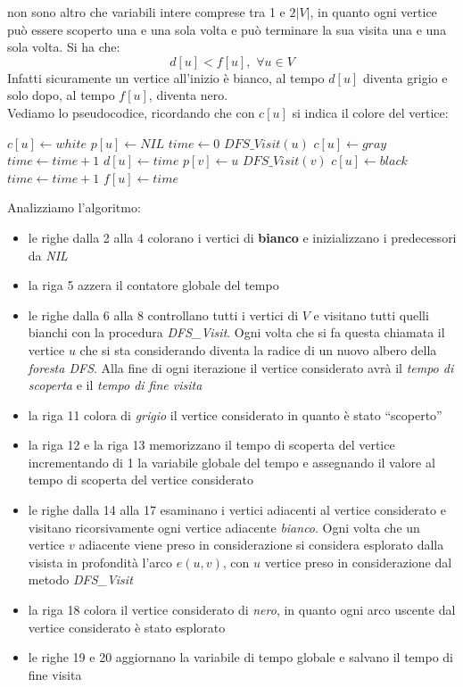 \documentclass[a4paper,12pt, oneside]{book}
\begin{document}
non sono altro che variabili intere comprese tra 1 e $2|V|$, in quanto
ogni vertice può essere scoperto una e una sola volta e può terminare
la sua visita una e una sola volta. Si ha che:
\[d[u]<f[u],\,\,\forall u\in V\]
Infatti sicuramente un vertice all'inizio è bianco, al tempo $d[u]$
diventa grigio e solo dopo, al tempo $f[u]$, diventa nero.\\
Vediamo lo pseudocodice, ricordando che con $c[u]$ si indica il colore
del vertice:
\begin{shaded}
  \begin{algorithmic}[1]
    \State $c[u]\gets white$
    \State $p[u]\gets NIL$
    \EndFor
    \State $time \gets 0$
    \State $DFS\_Visit(u)$
    \EndIf
    \EndFor
    \EndFunction
    \State
    \State $c[u] \gets gray$
    \State $time \gets time +1$
    \State $d[u] \gets time$
    \State $p[v] \gets u$
    \State $DFS\_Visit(v)$
    \EndIf
    \EndFor
    \State $c[u] \gets black$
    \State $time \gets time +1$
    \State $f[u] \gets time$
    \EndFunction
  \end{algorithmic}
\end{shaded}
Analizziamo l'algoritmo:
\begin{itemize}
  \item le righe dalla 2 alla 4 colorano i vertici di \textbf{bianco}
  e inizializzano i predecessori da \textit{NIL}
  \item la riga 5 azzera il contatore globale del tempo
  \item le righe dalla 6 alla 8 controllano tutti i vertici di $V$ e
  visitano tutti quelli bianchi con la procedura
  \textit{DFS\_Visit}. Ogni volta che si fa questa chiamata il vertice
  $u$ che si sta considerando diventa la radice di un nuovo albero
  della \textit{foresta DFS}. Alla fine di ogni iterazione il vertice
  considerato avrà il \textit{tempo di scoperta} e il \textit{tempo di
    fine visita}
  \newpage
  \item la riga 11 colora di \textit{grigio} il vertice considerato in
  quanto è stato ``scoperto''
  \item la riga 12 e la riga 13  memorizzano il tempo di scoperta del vertice
  incrementando di 1 la variabile globale del tempo e assegnando il
  valore al tempo di scoperta del vertice considerato
  \item le righe dalla 14 alla 17 esaminano i vertici adiacenti al
  vertice considerato e visitano ricorsivamente ogni vertice adiacente
  \textit{bianco}. Ogni volta che un vertice $v$ adiacente viene preso
  in considerazione si considera esplorato dalla visista in profondità
  l'arco $e(u,v)$, con $u$ vertice preso in considerazione dal metodo
  \textit{DFS\_Visit}
  \item la riga 18 colora il vertice considerato di \textit{nero}, in
  quanto ogni arco uscente dal vertice considerato è stato esplorato
  \item le righe 19 e 20 aggiornano la variabile di tempo globale
  e salvano il tempo di fine visita
\end{itemize}
\end{document}
